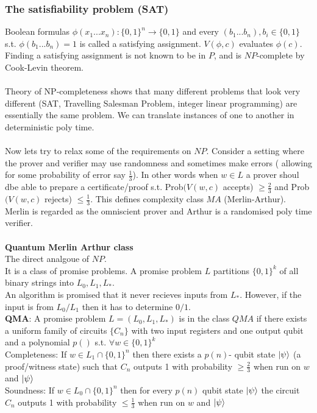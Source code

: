 \documentclass{article}
\begin{document}
\subsubsection{The satisfiability problem (SAT)}
Boolean formulas $\phi(x_1...x_n): \{ 0,1\}^n \rightarrow \{0,1\}$ and every $(b_1...b_n), b_i \in \{0,1\}$ s.t. $\phi(b_1...b_n) = 1$ is called a satisfying assignment. $V(\phi,c)$ evaluates $\phi(c)$. Finding a satisfying assignment is not known to be in $P$, and is $NP$-complete by Cook-Levin theorem.\\\\
Theory of NP-completeness shows that many different problems that look very different (SAT, Travelling Salesman Problem,  integer linear programming) are essentially the same problem. We can translate instances of one to another in deterministic poly time.\\\\
Now lets try to relax some of the requirements on $NP$. Consider a setting where the prover and verifier may use randomness and sometimes make errors ( allowing for some probability of error say $\frac{1}{3}$). In other words when $w \in L$ a prover shoul dbe able to prepare a certificate/proof s.t. Prob$(V(w,c)$ accepts) $\geq \frac{2}{3}$ and Prob$(V(w,c)$ rejects) $\leq \frac{1}{3}$. This defines complexity class $MA$ (Merlin-Arthur). Merlin is regarded as the omniscient prover and Arthur is a randomised poly time verifier. \\\\
\textbf{Quantum Merlin Arthur class}\\
The direct analgoue of $NP$.\\
It is a class of promise problems. A promise problem $L$ partitions $\{0,1\}^k$ of all binary strings into $L_0, L_1, L_*$.\\
An algorithm is promised that it never recieves inputs from $L_*$. However, if the input is from $L_0/L_1$ then it has to determine $0/1$.\\
\textbf{QMA}: A promise problem $L = (L_0,L_1,L_*)$ is in the class $QMA$ if there exists a uniform family of circuits $\{C_n\}$ with two input registers and one output qubit and a polynomial $p()$ s.t. $\forall w \in \{0,1\}^k$\\
Completeness: If $w \in L_1 \cap \{0,1\}^n$ then there exists a $p(n)$- qubit state $\ket{\psi}$ (a proof/witness state) such that $C_n$ outputs 1 with probability $\geq \frac{2}{3}$ when run on $w$ and $\ket{\psi}$\\
Soundness: If $w \in L_0 \cap \{0,1\}^n$ then for every $p(n)$ qubit state $\ket{\psi}$ the circuit $C_n$ outputs 1 with probability $\leq \frac{1}{3}$ when run on $w$ and $\ket{\psi}$\\
\end{document}
